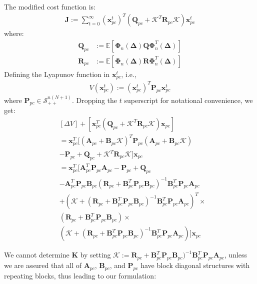 \documentclass[letterpaper, 10 pt, conference]{ieeeconf}  %
\newcommand{\vo}[1]{\boldsymbol{#1}}
\newcommand{\Del}{\vo{\Delta}}
\begin{document}
The modified cost function is:
\begin{align}
   \vo{J} := \sum_{t=0}^{\infty}(\vo{x}_{pc}^t)^T (\vo{Q}_{pc} + \vo{\mathcal{K}}^T \vo{R}_{pc} \vo{\mathcal{K}})\vo{x}_{pc}^t
\end{align}
where:
\begin{align}
   \vo{Q}_{pc} &:= \mathbb{E}[\vo{\Phi}_n(\Del) \vo{Q} \vo{\Phi}_n^T(\Del)] \\
   \vo{R}_{pc} &:= \mathbb{E}[\vo{\Phi}_n(\Del) \vo{R} \vo{\Phi}_n^T(\Del)]
\end{align}
Defining the Lyapunov function in $\vo{x}_{pc}^t$, i.e.,
\begin{align}
   V(\vo{x}_{pc}^t) := (\vo{x}_{pc}^t)^T \vo{P}_{pc} \vo{x}_{pc}^t
\end{align}
where $\vo{P}_{pc} \in \mathcal{S}^{n(N+1)}_{++}$. Dropping the $t$ superscript for notational convenience, we get:
\begin{align}
   &[\Delta V] +  [\vo{x}_{pc}^T (\vo{Q}_{pc} + \vo{\mathcal{K}}^T \vo{R}_{pc} \vo{\mathcal{K}}) \vo{x}_{pc} ]  \nonumber\\
      &= \vo{x}_{pc}^T [(\vo{A}_{pc} + \vo{B}_{pc} \vo{\mathcal{K}})^T \vo{P}_{pc}  (\vo{A}_{pc} + \vo{B}_{pc}\vo{\mathcal{K}}) \nonumber\\
      & - \vo{P}_{pc} + \vo{Q}_{pc} + \vo{\mathcal{K}}^T \vo{R}_{pc} \vo{\mathcal{K}}] \vo{x}_{pc}
      \nonumber \\
    & = \vo{x}_{pc}^T [ \vo{A}_{pc}^T \vo{P}_{pc} \vo{A}_{pc} - \vo{P}_{pc} + \vo{Q}_{pc}\nonumber\\
    & - \vo{A}_{pc}^T \vo{P}_{pc} \vo{B}_{pc} (\vo{R}_{pc} + \vo{B}_{pc}^T \vo{P}_{pc} \vo{B}_{pc})^{-1} \vo{B}_{pc}^{T} \vo{P}_{pc} \vo{A}_{pc} \nonumber\\
     &+ (\vo{\mathcal{K}} + (\vo{R}_{pc} + \vo{B}_{pc}^T \vo{P}_{pc} \vo{B}_{pc})^{-1} \vo{B}_{pc}^T \vo{P}_{pc} \vo{A}_{pc})^T \times \nonumber\\
      &(\vo{R}_{pc} + \vo{B}_{pc}^T \vo{P}_{pc} \vo{B}_{pc}) \times \nonumber \\
     & (\vo{\mathcal{K}} + (\vo{R}_{pc} + \vo{B}_{pc}^T \vo{P}_{pc} \vo{B}_{pc})^{-1} \vo{B}_{pc}^T \vo{P}_{pc} \vo{A}_{pc})] \vo{x}_{pc}
      \label{eqn:redOrderEqn}
\end{align}

We cannot determine $\vo{K}$ by setting $\vo{\mathcal{K}} := \vo{R}_{pc} + \vo{B}_{pc}^T \vo{P}_{pc} \vo{B}_{pc})^{-1} \vo{B}_{pc}^T \vo{P}_{pc} \vo{A}_{pc}$, unless we are assured that all of $\vo{A}_{pc}$, $\vo{B}_{pc}$, and $\vo{P}_{pc}$
have block diagonal structures with repeating blocks, thus leading to our formulation:
\end{document}
